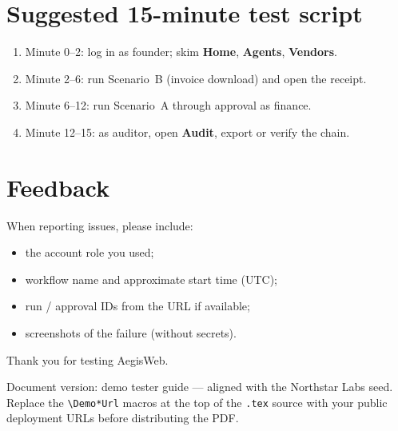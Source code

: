 \documentclass[11pt,a4paper]{article}
\newcommand{\ProductName}{AegisWeb}
\newcommand{\ui}[1]{\textbf{#1}}
\begin{document}
\section{Suggested 15-minute test script}

\begin{enumerate}[leftmargin=1.3em]
  \item Minute 0--2: log in as founder; skim \ui{Home}, \ui{Agents}, \ui{Vendors}.
  \item Minute 2--6: run Scenario~B (invoice download) and open the receipt.
  \item Minute 6--12: run Scenario~A through approval as finance.
  \item Minute 12--15: as auditor, open \ui{Audit}, export or verify the chain.
\end{enumerate}

\section{Feedback}

When reporting issues, please include:

\begin{itemize}[leftmargin=1.2em]
  \item the account role you used;
  \item workflow name and approximate start time (UTC);
  \item run / approval IDs from the URL if available;
  \item screenshots of the failure (without secrets).
\end{itemize}

Thank you for testing \ProductName.

\vspace{1.2em}
{\small\color{aegisgray}
  Document version: demo tester guide --- aligned with the Northstar Labs seed.\\
  Replace the \texttt{\textbackslash Demo*Url} macros at the top of the \texttt{.tex}
  source with your public deployment URLs before distributing the PDF.
}
\end{document}
